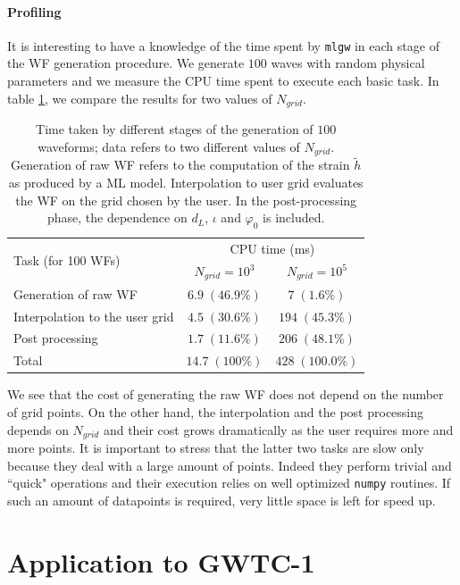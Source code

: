 \paragraph{Profiling}
It is interesting to have a knowledge of the time spent by \texttt{mlgw} in each stage of the WF generation procedure.
We generate $100$ waves with random physical parameters and we measure the CPU time spent to execute each basic task.
In table \ref{tab:profiling}, we compare the results for two values of $N_{grid}$.
\begin{table}
	\def\arraystretch{1.5}
	\begin{tabular}{ l c c }
		\multirow{2}{*}{Task (for 100 WFs)}& \multicolumn{2}{c}{CPU time (ms)}\\
			&$N_{grid} = 10^3$	& $N_{grid} = 10^5$\\
	\hline \hline
		 Generation of raw WF 			& $6.9 \; (46.9\%)$	& $7 \; (1.6\%)$ \\ 
	\hline
		 Interpolation to the user grid & $4.5 \; (30.6\%)$	& $194 \; (45.3\%)$ \\ 
	\hline
		 Post processing 				& $1.7 \; (11.6\%)$	& $206 \; (48.1\%)$ \\
	\hline
		 Total							& $14.7 \; (100\%)$ &  $428 \; (100.0\%)$ \\
	\hline \hline
	\end{tabular}
	\caption{
Time taken by different stages of the generation of $100$ waveforms; data refers to two different values of $N_{grid}$.
Generation of raw WF refers to the computation of the strain $\tilde{h}$ as produced by a ML model. Interpolation to user grid evaluates the WF on the grid chosen by the user. In the post-processing phase, the dependence on $d_L$, $\iota$ and $\varphi_0$ is included.
}
	\label{tab:profiling}
\end{table}
\par
We see that the cost of generating the raw WF does not depend on the number of grid points. On the other hand, the interpolation and the post processing depends on $N_{grid}$ and their cost grows dramatically as the user requires more and more points.
It is important to stress that the latter two tasks are slow only because they deal with a large amount of points. Indeed they perform trivial and ``quick" operations and their execution relies on well optimized \texttt{numpy} routines.
If such an amount of datapoints is required, very little space is left for speed up.
\par

\section{Application to GWTC-1}
\label{sec:GWTC1}

